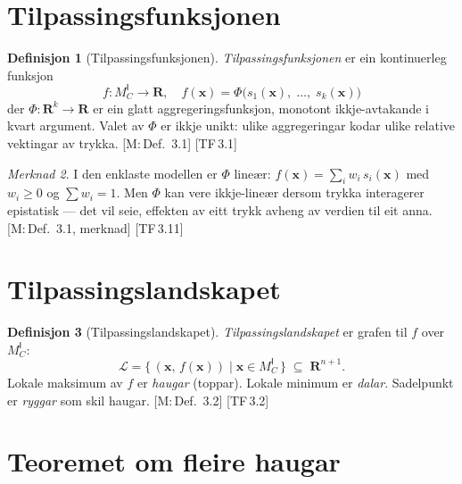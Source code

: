 \documentclass[10pt]{book}
\theoremstyle{definition}
\newtheorem{definisjon}{Definisjon}[chapter]
\theoremstyle{plain}
\theoremstyle{remark}
\newtheorem{merknad}[definisjon]{Merknad}
\newcommand{\MC}{M^{\mathsf{I}}_C}
\providecommand{\R}{}
\renewcommand{\R}{\mathbf{R}}
\newcommand{\FitLand}{\mathcal{L}}
\newcommand{\TF}[1]{\textnormal{[TF\,#1]}}
\newcommand{\Mref}[1]{\textnormal{[M:\,#1]}}
\begin{document}
\section{Tilpassingsfunksjonen}\label{sec:landskap:funksjon}

\begin{definisjon}[Tilpassingsfunksjonen]\label{def:tilpassing}
\emph{Tilpassingsfunksjonen} er ein kontinuerleg funksjon
\[
  f : \MC \longrightarrow \R, \quad
  f(\bm{x}) = \Phi\bigl(s_1(\bm{x}),\; \ldots,\; s_k(\bm{x})\bigr)
\]
der $\Phi : \R^k \to \R$ er ein glatt aggregeringsfunksjon, monotont ikkje-avtakande i kvart argument. Valet av $\Phi$ er ikkje unikt: ulike aggregeringar kodar ulike relative vektingar av trykka. \Mref{Def.~3.1} \TF{3.1}
\end{definisjon}

\begin{merknad}
I den enklaste modellen er $\Phi$ line\ae r: $f(\bm{x}) = \sum_i w_i \, s_i(\bm{x})$ med $w_i \geq 0$ og $\sum w_i = 1$. Men $\Phi$ kan vere ikkje-line\ae r dersom trykka interagerer epistatisk --- det vil seie, effekten av eitt trykk avheng av verdien til eit anna. \Mref{Def.~3.1, merknad} \TF{3.11}
\end{merknad}

\section{Tilpassingslandskapet}\label{sec:landskap:def}

\begin{definisjon}[Tilpassingslandskapet]\label{def:landskap}
\emph{Tilpassingslandskapet} er grafen til $f$ over $\MC$:
\[
  \FitLand = \bigl\{\, (\bm{x},\, f(\bm{x})) \;\big|\; \bm{x} \in \MC \,\bigr\} \;\subseteq\; \R^{n+1}.
\]
Lokale maksimum av $f$ er \emph{haugar} (toppar). Lokale minimum er \emph{dalar}. Sadelpunkt er \emph{ryggar} som skil haugar. \Mref{Def.~3.2} \TF{3.2}
\end{definisjon}

\section{Teoremet om fleire haugar}\label{sec:landskap:haugar}
\end{document}
